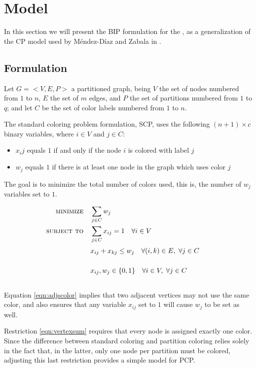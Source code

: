 
\section{Model}
\label{sec:model}

In this section we will present the BIP formulation for the \PCP{}, as a generalization of the CP model used by M\'endez-D\'iaz and Zabala in \cite{mendez2008cutting}.

\subsection{Formulation}
\label{subsec:model:formulation}

Let $G = <V,E,P>$ a partitioned graph, being $V$ the set of nodes numbered from $1$ to $n$, $E$ the set of $m$ edges, and $P$ the set of partitions numbered from $1$ to $q$; and let $C$ be the set of color labels numbered from $1$ to $n$.

The standard coloring problem formulation, SCP, uses the following $(n + 1) \times c$ binary variables, where $i \in V$ and $j \in C$:
\begin{itemize}
\item $x_ij$ equals $1$ if and only if the node $i$ is colored with label $j$
\item $w_j$ equals $1$ if there is at least one node in the graph which uses color $j$
\end{itemize}

The goal is to minimize the total number of colors used, this is, the number of $w_j$ variables set to $1$.

\begin{align}
\text{\textsc{minimize}} \quad & \sum_{j \in C} w_j \nonumber \\
\text{\textsc{subject to}} \quad & \sum_{j \in C} x_{ij} = 1 \quad \forall i \in V \label{eqn:vertexsum} \\
& x_{ij} + x_{kj} \leq w_j \quad \forall (i,k) \in E, \; \forall j \in C \sumheight \label{eqn:adjscolor}\\
& x_{ij}, w_{j} \in \{0,1\} \quad \forall i \in V, \; \forall j \in C \sumheight \nonumber
\end{align}

Equation \ref{eqn:adjscolor} implies that two adjacent vertices may not use the same color, and also ensures that any variable $x_{ij}$ set to $1$ will cause $w_j$ to be set as well.

Restriction \ref{eqn:vertexsum} requires that every node is assigned exactly one color. Since the difference between standard coloring and partition coloring relies solely in the fact that, in the latter, only one node per partition must be colored, adjusting this last restriction provides a simple model for PCP.


